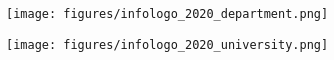 \hypersetup{pageanchor=false}
\begin{titlepage}
\begin{center}

\begin{figure}[!htb]
	\begin{minipage}{0.48\textwidth}
	  \centering
	  \hspace{-2cm}\texttt{[image: figures/infologo\_2020\_department.png]}
	\end{minipage}\hfill
	\begin{minipage}{0.48\textwidth}
	  \centering
	  \hspace{-2cm}\texttt{[image: figures/infologo\_2020\_university.png]}
	\end{minipage}
 \end{figure}
 

\vspace{100pt} %
{\Huge \bfseries \MakeUppercase {\doktipus}}\\
\vspace{68pt}
{\huge \bfseries{\szerzo}}\\
\vspace{100pt}
{\huge \bfseries \cim}


\vspace{80pt}
\Large \textbf{\szak{}}\\
\Large \textbf{\szakma{}}\\

\vfill

\end{center}
\end{titlepage}
\hypersetup{pageanchor=false}
